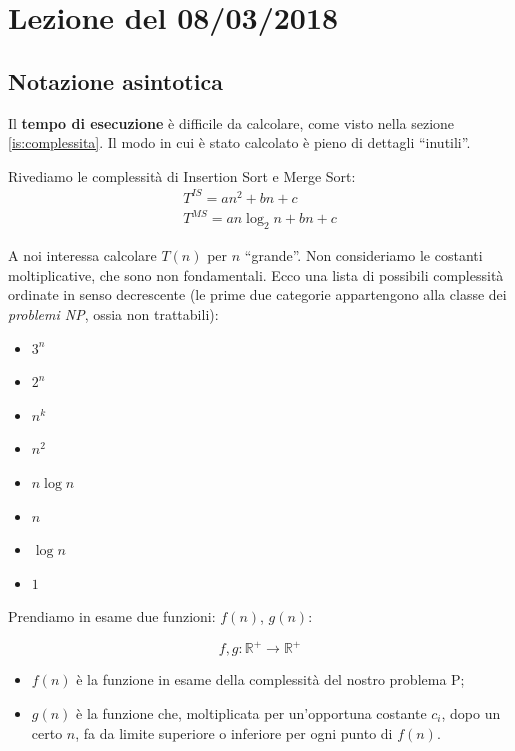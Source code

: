 \section{Lezione del 08/03/2018}

\subsection{Notazione asintotica}
Il \textbf{tempo di esecuzione} è difficile da calcolare, come visto nella sezione \ref{is:complessita}. 
Il modo in cui è stato calcolato è pieno di dettagli ``inutili''.\par
Rivediamo le complessità di Insertion Sort e Merge Sort:
\begin{gather*}
	T^{IS} = an^2 + bn + c \\
	T^{MS} = an \log_2 n + bn + c
\end{gather*}

A noi interessa calcolare $T(n)$ per $n$ ``grande''. Non consideriamo le costanti moltiplicative, che sono non fondamentali. Ecco una lista di possibili complessità ordinate in senso decrescente (le prime due categorie appartengono alla classe dei \emph{problemi NP}, ossia non trattabili):

\begin{itemize}[noitemsep]
	\item $3^n$
	\item $2^n$
	\medskip
	\item $n^k$
	\item $n^2$
	\item $n \log n$
	\item $n$
	\item $\log n$
	\item $1$
\end{itemize}

Prendiamo in esame due funzioni: $f(n)$, $g(n)$:

\begin{displaymath}
f, g: \mathbb{R}^+ \rightarrow \mathbb{R}^+
\end{displaymath}

\begin{itemize}
	\item $f(n)$ è la funzione in esame della complessità del nostro problema P;
	\item $g(n)$ è la funzione che, moltiplicata per un'opportuna costante $c_i$, dopo un certo $n$, fa da 
	limite superiore o inferiore per ogni punto di $f(n)$.
\end{itemize}

